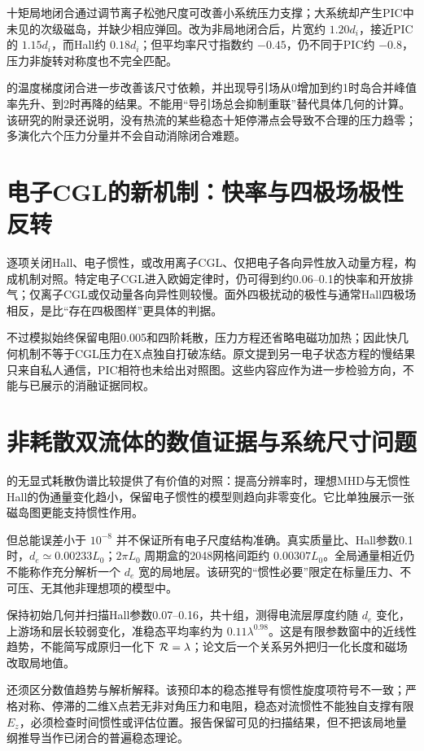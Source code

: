 十矩局地闭合通过调节离子松弛尺度可改善小系统压力支撑；大系统却产生PIC中未见的次级磁岛，并缺少相应弹回。\citet{Ng2017}改为非局地闭合后，片宽约 $1.20d_i$，接近PIC的 $1.15d_i$，而Hall约 $0.18d_i$；但平均率尺寸指数约 $-0.45$，仍不同于PIC约 $-0.8$，压力非旋转对称度也不完全匹配。

\citet{Ng2020}的温度梯度闭合进一步改善该尺寸依赖，并出现导引场从0增加到约1时岛合并峰值率先升、到2时再降的结果。不能用“导引场总会抑制重联”替代具体几何的计算。该研究的附录还说明，没有热流的某些稳态十矩停滞点会导致不合理的压力趋零；多演化六个压力分量并不会自动消除闭合难题。

\section{电子CGL的新机制：快率与四极场极性反转}
\citet{Cassak2015}逐项关闭Hall、电子惯性，或改用离子CGL、仅把电子各向异性放入动量方程，构成机制对照。特定电子CGL进入欧姆定律时，仍可得到约0.06--0.1的快率和开放排气；仅离子CGL或仅动量各向异性则较慢。面外四极扰动的极性与通常Hall四极场相反，是比“存在四极图样”更具体的判据。

不过模拟始终保留电阻0.005和四阶耗散，压力方程还省略电磁功加热；因此快几何机制不等于CGL压力在X点独自打破冻结。原文提到另一电子状态方程的慢结果只来自私人通信，PIC相符也未给出对照图。这些内容应作为进一步检验方向，不能与已展示的消融证据同权。

\section{非耗散双流体的数值证据与系统尺寸问题}
\citet{Andres2014}的无显式耗散伪谱比较提供了有价值的对照：提高分辨率时，理想MHD与无惯性Hall的伪通量变化趋小，保留电子惯性的模型则趋向非零变化。它比单独展示一张磁岛图更能支持惯性作用。

但总能误差小于 $10^{-8}$ 并不保证所有电子尺度结构准确。真实质量比、Hall参数0.1时，$d_e\simeq0.00233L_0$；$2\pi L_0$ 周期盒的2048网格间距约 $0.00307L_0$。全局通量相近仍不能称作充分解析一个 $d_e$ 宽的局地层。该研究的“惯性必要”限定在标量压力、不可压、无其他非理想项的模型中。

\citet{Andres2016}保持初始几何并扫描Hall参数0.07--0.16，共十组，测得电流层厚度约随 $d_e$ 变化，上游场和层长较弱变化，准稳态平均率约为 $0.11\lambda^{0.98}$。这是有限参数窗中的近线性趋势，不能简写成原归一化下 $\mathcal R=\lambda$；论文后一个关系另外把归一化长度和磁场改取局地值。

还须区分数值趋势与解析解释。该预印本的稳态推导有惯性旋度项符号不一致；严格对称、停滞的二维X点若无非对角压力和电阻，稳态对流惯性不能独自支撑有限 $E_z$，必须检查时间惯性或评估位置。报告保留可见的扫描结果，但不把该局地量纲推导当作已闭合的普遍稳态理论。

